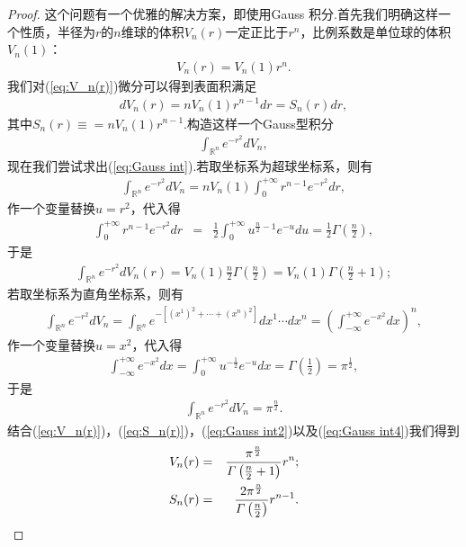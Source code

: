 	\begin{proof}
		这个问题有一个优雅的解决方案，即使用Gauss 积分.首先我们明确这样一个性质，半径为$r$的$n$维球的体积$V_n(r)$一定正比于$r^n$，比例系数是单位球的体积$V_n(1)$：
		\begin{eqnarray}\label{eq:V_n(r)}
			V_n(r)=V_n(1)r^n. 
		\end{eqnarray}
		我们对(\ref{eq:V_n(r)})微分可以得到表面积满足
		\begin{eqnarray}\label{eq:S_n(r)}
			dV_n(r)=nV_n(1)r^{n-1}dr=S_n(r)dr, 
		\end{eqnarray}
		其中$S_n(r)\equiv =nV_n(1)r^{n-1}$.构造这样一个Gauss型积分
		\begin{eqnarray}\label{eq:Gauss int}
		\int_{\mathbb{R}^n}e^{-r^2}dV_n,
		\end{eqnarray}
		现在我们尝试求出(\ref{eq:Gauss int}).若取坐标系为超球坐标系，则有
		\begin{eqnarray}\label{eq:Gauss int1}
			\int_{\mathbb{R}^n}e^{-r^2}dV_n=nV_n(1)\int_0^{+\infty}r^{n-1}e^{-r^2}dr,
		\end{eqnarray}
		作一个变量替换$u=r^2$，代入得
		\begin{eqnarray*}
			\int_0^{+\infty}r^{n-1}e^{-r^2}dr&=&\frac{1}{2}\int_0^{+\infty}u^{\frac{n}{2}-1}e^{-u}du=\frac{1}{2}\varGamma\left(\frac{n}{2}\right),
		\end{eqnarray*}
		于是
		\begin{eqnarray}\label{eq:Gauss int2}
			\int_{\mathbb{R}^n}e^{-r^2}dV_n(r)=V_n(1)\frac{n}{2}\varGamma\left(\frac{n}{2}\right)=V_n(1)\varGamma\left(\frac{n}{2}+1\right);
		\end{eqnarray}
		若取坐标系为直角坐标系，则有
		\begin{eqnarray}\label{eq:Gauss int3}
			\int_{\mathbb{R}^n}e^{-r^2}dV_n=\int_{\mathbb{R}^n}e^{-\left[(x^1)^2+\cdots+(x^n)^2\right]}dx^1\cdots dx^n=\left(\int_{-\infty}^{+\infty}e^{-x^2}dx\right)^n,
		\end{eqnarray}
		作一个变量替换$u=x^2$，代入得
		\begin{eqnarray*}
			\int_{-\infty}^{+\infty}e^{-x^2}dx=\int_{0}^{+\infty}u^{-\frac{1}{2}}e^{-u}dx=\varGamma\left(\frac{1}{2}\right)=\pi^{\frac{1}{2}},
		\end{eqnarray*}
		于是
		\begin{eqnarray}\label{eq:Gauss int4}
			\int_{\mathbb{R}^n}e^{-r^2}dV_n=\pi^{\frac{n}{2}}.
		\end{eqnarray}
		结合(\ref{eq:V_n(r)})，(\ref{eq:S_n(r)})，(\ref{eq:Gauss int2})以及(\ref{eq:Gauss int4})我们得到
		\begin{eqnarray}
			V_n(r)&=&\frac{\pi^{\frac{n}{2}}}{\varGamma\left(\frac{n}{2}+1\right)}r^n;\notag\\
			S_n(r)&=&\frac{2\pi^{\frac{n}{2}}}{\varGamma\left(\frac{n}{2}\right)}r^{n-1}.\notag
		\end{eqnarray}
	\end{proof}


